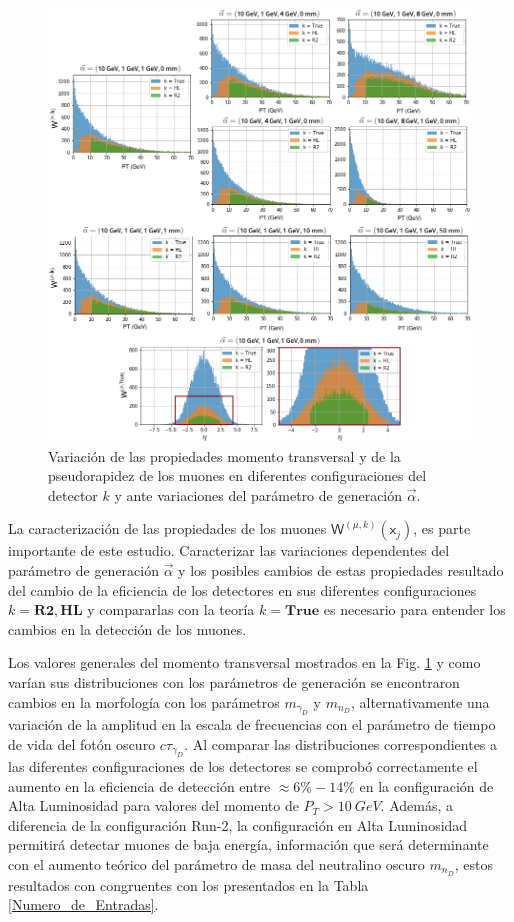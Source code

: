 \begin{figure}[!h]
\centering
\includegraphics[width=.98\textwidth]{Cap4/imagenes/PT_comparacion.png}
\caption{Variación de las propiedades momento transversal y de la pseudorapidez de los muones en diferentes configuraciones del detector $k$ y ante variaciones del parámetro de generación $\vec{\alpha}$.}
\label{Comparacion}
\end{figure}

La caracterización de las propiedades de los muones $ \textsf{W}^{(\mu,k)} ({\textsf{x}_j})$, es parte importante de este estudio. Caracterizar las variaciones dependentes del parámetro de generación $\vec{\alpha}$ y los posibles cambios de estas propiedades resultado del cambio de la eficiencia de los detectores en sus diferentes configuraciones $k=\mathbf{R2}, \mathbf{HL}$ y compararlas con la teoría $k=\mathbf{True}$ es necesario para entender los cambios en la detección de los muones. 

Los valores generales del momento transversal mostrados en la Fig. \ref{Comparacion} y como varían sus distribuciones con los parámetros de generación se encontraron cambios en la morfología con los parámetros $m_{\gamma_D}$ y $m_{n_D}$, alternativamente una variación de la amplitud  en la escala de frecuencias con el parámetro de tiempo de vida del fotón oscuro $c\tau_{\gamma_D}$. Al comparar las distribuciones correspondientes a las diferentes configuraciones de los detectores se comprobó correctamente el aumento en la eficiencia de detección entre $\approx 6\%-14\%$ en la configuración de Alta Luminosidad para valores del momento de $P_T>10 ~GeV$. Además, a diferencia de la configuración Run-2, la configuración en Alta Luminosidad permitirá detectar muones de baja energía, información que será determinante con el aumento teórico del parámetro de masa del neutralino oscuro $m_{n_D}$, estos resultados con congruentes con los presentados en la Tabla \ref{Numero_de_Entradas}.

